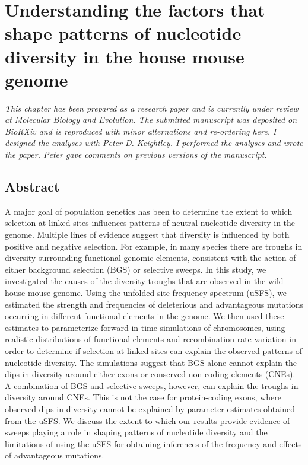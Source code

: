 \chapter{Understanding the factors that shape patterns of nucleotide diversity in the house mouse genome}

\emph{This chapter has been prepared as a research paper and is currently under review at Molecular Biology and Evolution. The submitted manuscript was deposited on \textit{BioRXiv} and is reproduced with minor alternations and re-ordering here. I designed the analyses with Peter D. Keightley. I performed the analyses and wrote the paper. Peter gave comments on previous versions of the manuscript.}

\section{Abstract}
	A major goal of population genetics has been to determine the extent to which selection at linked sites influences patterns of neutral nucleotide diversity in the genome. Multiple lines of evidence suggest that diversity is influenced by both positive and negative selection. For example, in many species there are troughs in diversity surrounding functional genomic elements, consistent with the action of either background selection (BGS) or selective sweeps. In this study, we investigated the causes of the diversity troughs that are observed in the wild house mouse genome. Using the unfolded site frequency spectrum (uSFS), we estimated the strength and frequencies of deleterious and advantageous mutations occurring in different functional elements in the genome. We then used these estimates to parameterize forward-in-time simulations of chromosomes, using realistic distributions of functional elements and recombination rate variation in order to determine if selection at linked sites can explain the observed patterns of nucleotide diversity. The simulations suggest that BGS alone cannot explain the dips in diversity around either exons or conserved non-coding elements (CNEs). A combination of BGS and selective sweeps, however, can explain the troughs in diversity around CNEs. This is not the case for protein-coding exons, where observed dips in diversity cannot be explained by parameter estimates obtained from the uSFS. We discuss the extent to which our results provide evidence of sweeps playing a role in shaping patterns of nucleotide diversity and the limitations of using the uSFS for obtaining inferences of the frequency and effects of advantageous mutations.



